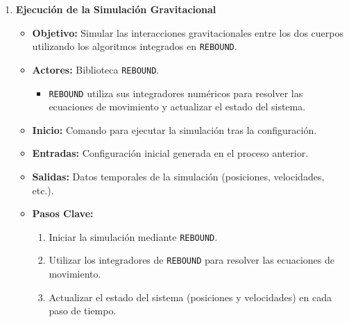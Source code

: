 \begin{enumerate}
    \item \textbf{Ejecución de la Simulación Gravitacional}
        \begin{itemize}
            \item \textbf{Objetivo:} Simular las interacciones gravitacionales entre los dos cuerpos utilizando los algoritmos integrados en \texttt{REBOUND}.
            \item \textbf{Actores:} Biblioteca \texttt{REBOUND}.
                \begin{itemize}
                    \item \texttt{REBOUND} utiliza sus integradores numéricos para resolver las ecuaciones de movimiento y actualizar el estado del sistema.
                \end{itemize}
            \item \textbf{Inicio:} Comando para ejecutar la simulación tras la configuración.
            \item \textbf{Entradas:} Configuración inicial generada en el proceso anterior.
            \item \textbf{Salidas:} Datos temporales de la simulación (posiciones, velocidades, etc.).
            \item \textbf{Pasos Clave:}
                \begin{enumerate}
                    \item Iniciar la simulación mediante \texttt{REBOUND}.
                    \item Utilizar los integradores de \texttt{REBOUND} para resolver las ecuaciones de movimiento.
                    \item Actualizar el estado del sistema (posiciones y velocidades) en cada paso de tiempo.
                \end{enumerate}
        \end{itemize}


\end{enumerate}
